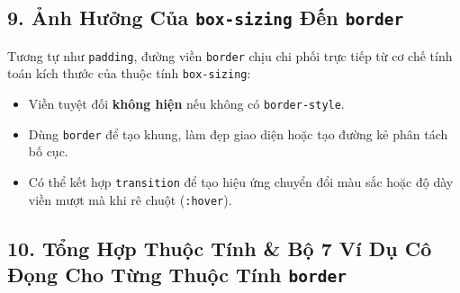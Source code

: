 \documentclass[11pt,oneside]{book}
\newcommand{\thd}[1]{\textcolor{white}{\textbf{\strut #1}}}
\newcommand{\codeinline}[1]{\textcolor{accentOrange}{\texttt{#1}}}
\DeclareRobustCommand{\csshint}[1]{\texorpdfstring{\textcolor{accentOrange}{\textbf{\texttt{#1}}}}{#1}}
\begin{document}
\subsection{9. Ảnh Hưởng Của \csshint{box-sizing} Đến \csshint{border}}

Tương tự như \codeinline{padding}, đường viền \codeinline{border} chịu chi phối trực tiếp từ cơ chế tính toán kích thước của thuộc tính \codeinline{box-sizing}:

\begin{prettyTableBox}
\end{prettyTableBox}

\begin{noteBox}
\begin{itemize}[leftmargin=1.5em, itemsep=2.5pt, parsep=0pt]
    \item Viền tuyệt đối \textbf{không hiện} nếu không có \codeinline{border-style}.
    \item Dùng \codeinline{border} để tạo khung, làm đẹp giao diện hoặc tạo đường kẻ phân tách bố cục.
    \item Có thể kết hợp \codeinline{transition} để tạo hiệu ứng chuyển đổi màu sắc hoặc độ dày viền mượt mà khi rê chuột (\codeinline{:hover}).
\end{itemize}
\end{noteBox}

\subsection{10. Tổng Hợp Thuộc Tính \& Bộ 7 Ví Dụ Cô Đọng Cho Từng Thuộc Tính \csshint{border}}
\end{document}
